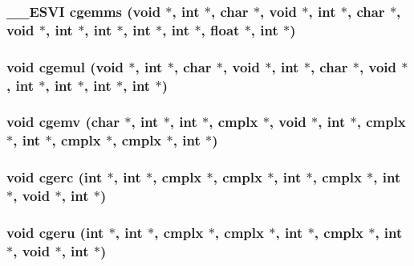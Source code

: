 \subsubsection{\setlength{\rightskip}{0pt plus 5cm}\_\-\_\-ESVI cgemms (void $\ast$, int $\ast$, char $\ast$, void $\ast$, int $\ast$, char $\ast$, void $\ast$, int $\ast$, int $\ast$, int $\ast$, int $\ast$, float $\ast$, int $\ast$)}\label{essl_8h_f9c80ba29a591c1afb88fbc1829ad155}


\subsubsection{\setlength{\rightskip}{0pt plus 5cm}void cgemul (void $\ast$, int $\ast$, char $\ast$, void $\ast$, int $\ast$, char $\ast$, void $\ast$, int $\ast$, int $\ast$, int $\ast$, int $\ast$)}\label{essl_8h_80388b0bb6aa119d6ac97584907e3cba}


\subsubsection{\setlength{\rightskip}{0pt plus 5cm}void cgemv (char $\ast$, int $\ast$, int $\ast$, {\bf cmplx} $\ast$, void $\ast$, int $\ast$, {\bf cmplx} $\ast$, int $\ast$, {\bf cmplx} $\ast$, {\bf cmplx} $\ast$, int $\ast$)}\label{essl_8h_6b2a1392b44ad6fc741f7a0d2eb83444}


\subsubsection{\setlength{\rightskip}{0pt plus 5cm}void cgerc (int $\ast$, int $\ast$, {\bf cmplx} $\ast$, {\bf cmplx} $\ast$, int $\ast$, {\bf cmplx} $\ast$, int $\ast$, void $\ast$, int $\ast$)}\label{essl_8h_a087f4a3f68bf997c774b1be9ebafd40}


\subsubsection{\setlength{\rightskip}{0pt plus 5cm}void cgeru (int $\ast$, int $\ast$, {\bf cmplx} $\ast$, {\bf cmplx} $\ast$, int $\ast$, {\bf cmplx} $\ast$, int $\ast$, void $\ast$, int $\ast$)}\label{essl_8h_2c1fa93a4e9d3092838a2ab3d7f3e0dd}


